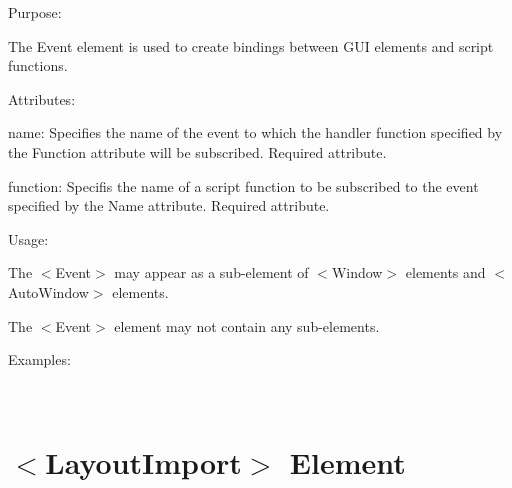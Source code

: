 \begin{DoxyItemize}
\item Purpose\+:
\begin{DoxyItemize}
\item The Event element is used to create bindings between G\+UI elements and script functions.
\end{DoxyItemize}
\item Attributes\+:
\begin{DoxyItemize}
\item {\ttfamily name\+:} Specifies the name of the event to which the handler function specified by the {\ttfamily Function} attribute will be subscribed. Required attribute.
\item {\ttfamily function\+:} Specifis the name of a script function to be subscribed to the event specified by the {\ttfamily Name} attribute. Required attribute.
\end{DoxyItemize}
\item Usage\+:
\begin{DoxyItemize}
\item The $<$Event$>$ may appear as a sub-\/element of $<$Window$>$ elements and $<$Auto\+Window$>$ elements.
\item The $<$Event$>$ element may not contain any sub-\/elements.
\end{DoxyItemize}
\item Examples\+:
\end{DoxyItemize}

~\newline
 \hypertarget{xml_layout_xml_layout_layoutimport}{}\section{$<$\+Layout\+Import$>$ Element}\label{xml_layout_xml_layout_layoutimport}

